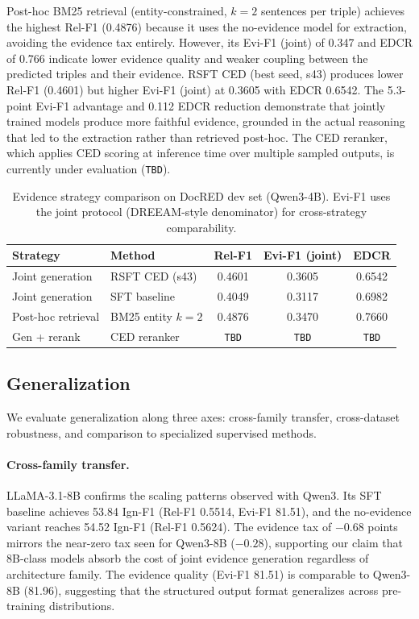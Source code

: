 Post-hoc BM25 retrieval (entity-constrained, $k{=}2$ sentences per triple) achieves the highest Rel-F1 (0.4876) because it uses the no-evidence model for extraction, avoiding the evidence tax entirely. However, its Evi-F1 (joint) of 0.347 and EDCR of 0.766 indicate lower evidence quality and weaker coupling between the predicted triples and their evidence. RSFT CED (best seed, s43) produces lower Rel-F1 (0.4601) but higher Evi-F1 (joint) at 0.3605 with EDCR 0.6542. The 5.3-point Evi-F1 advantage and 0.112 EDCR reduction demonstrate that jointly trained models produce more faithful evidence, grounded in the actual reasoning that led to the extraction rather than retrieved post-hoc. The CED reranker, which applies CED scoring at inference time over multiple sampled outputs, is currently under evaluation (\texttt{TBD}).

\begin{table}[t]
\centering
\caption{Evidence strategy comparison on DocRED dev set (Qwen3-4B). Evi-F1 uses the joint protocol (DREEAM-style denominator) for cross-strategy comparability.}
\label{tab:evidence_strategy}
\small
\begin{tabular}{llccc}
\toprule
\textbf{Strategy} & \textbf{Method} & \textbf{Rel-F1} & \textbf{Evi-F1 (joint)} & \textbf{EDCR} \\
\midrule
Joint generation & RSFT CED (s43) & 0.4601 & 0.3605 & 0.6542 \\
Joint generation & SFT baseline & 0.4049 & 0.3117 & 0.6982 \\
Post-hoc retrieval & BM25 entity $k{=}2$ & 0.4876 & 0.3470 & 0.7660 \\
Gen + rerank & CED reranker & \texttt{TBD} & \texttt{TBD} & \texttt{TBD} \\
\bottomrule
\end{tabular}
\end{table}


\subsection{Generalization}
\label{sec:generalization}

We evaluate generalization along three axes: cross-family transfer, cross-dataset robustness, and comparison to specialized supervised methods.

\paragraph{Cross-family transfer.}
LLaMA-3.1-8B confirms the scaling patterns observed with Qwen3. Its SFT baseline achieves 53.84 Ign-F1 (Rel-F1 0.5514, Evi-F1 81.51), and the no-evidence variant reaches 54.52 Ign-F1 (Rel-F1 0.5624). The evidence tax of $-0.68$ points mirrors the near-zero tax seen for Qwen3-8B ($-0.28$), supporting our claim that 8B-class models absorb the cost of joint evidence generation regardless of architecture family. The evidence quality (Evi-F1 81.51) is comparable to Qwen3-8B (81.96), suggesting that the structured output format generalizes across pre-training distributions.

